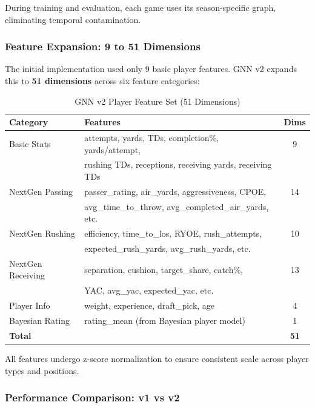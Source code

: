 During training and evaluation, each game uses its season-specific graph, eliminating temporal contamination.

\subsubsection{Feature Expansion: 9 to 51 Dimensions}
\label{subsubsec:gnn_feature_expansion}

The initial implementation used only 9 basic player features. GNN v2 expands this to \textbf{51 dimensions} across six feature categories:

\begin{table}[htbp]
\centering
\caption{GNN v2 Player Feature Set (51 Dimensions)}
\label{tab:gnn_v2_features}
\small
\begin{tabular}{@{}llc@{}}
\toprule
\textbf{Category} & \textbf{Features} & \textbf{Dims} \\
\midrule
Basic Stats & attempts, yards, TDs, completion\%, yards/attempt, & 9 \\
            & rushing TDs, receptions, receiving yards, receiving TDs & \\
NextGen Passing & passer\_rating, air\_yards, aggressiveness, CPOE, & 14 \\
                & avg\_time\_to\_throw, avg\_completed\_air\_yards, etc. & \\
NextGen Rushing & efficiency, time\_to\_los, RYOE, rush\_attempts, & 10 \\
                & expected\_rush\_yards, avg\_rush\_yards, etc. & \\
NextGen Receiving & separation, cushion, target\_share, catch\%, & 13 \\
                  & YAC, avg\_yac, expected\_yac, etc. & \\
Player Info & weight, experience, draft\_pick, age & 4 \\
Bayesian Rating & rating\_mean (from Bayesian player model) & 1 \\
\midrule
\textbf{Total} & & \textbf{51} \\
\bottomrule
\end{tabular}
\end{table}

All features undergo z-score normalization to ensure consistent scale across player types and positions.

\subsubsection{Performance Comparison: v1 vs v2}
\label{subsubsec:gnn_v1_v2_comparison}

